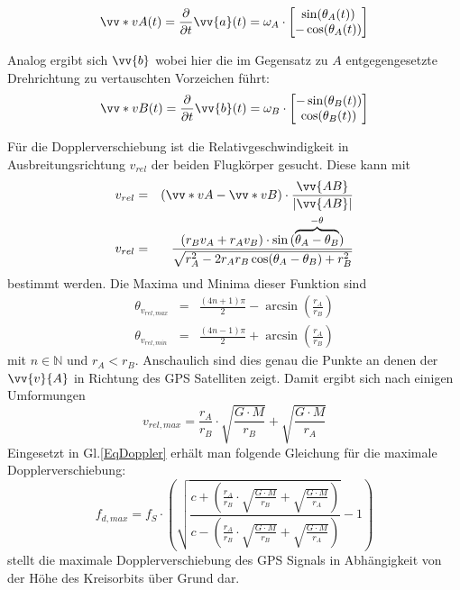 \begin{equation}
    \vv*{v}{A}(t)=\frac{\partial}{\partial t}\vv{a}(t)
    = \omega_A \cdot \begin{bmatrix} 
        \sin(\theta_A(t))\\ 
        -\cos(\theta_A(t)) 
    \end{bmatrix}
\end{equation}

Analog ergibt sich $\vv{b}$ wobei hier die im Gegensatz zu $A$ entgegengesetzte Drehrichtung zu vertauschten Vorzeichen führt:
\begin{equation}
    \vv*{v}{B}(t)=\frac{\partial}{\partial t}\vv{b}(t)
    = \omega_B \cdot \begin{bmatrix} 
        -\sin(\theta_B(t))\\ 
        \cos(\theta_B(t)) 
    \end{bmatrix}
\end{equation}

Für die Dopplerverschiebung ist die Relativgeschwindigkeit in Ausbreitungsrichtung $v_{rel}$ der beiden Flugkörper gesucht. Diese kann mit 
\begin{eqnarray}
    v_{rel} &=&(\vv*{v}{A}-\vv*{v}{B} ) \cdot \frac{\vv{AB}}{|\vv{AB}|}\\
     v_{rel} &=& \frac{(r_B v_A + r_A v_B) \cdot \sin{(\overbrace{\theta_A-\theta_B}^{-\theta}})}{\sqrt{r_A^2-2 r_A r_B \cos(\theta_A-\theta_B)+r_B^2}}
\end{eqnarray}
bestimmt werden. Die Maxima und Minima dieser Funktion sind
\begin{eqnarray}
    \theta_{v_{rel,max}}&=&\frac{(4n+1)\pi}{2}-\arcsin\left(\frac{r_A}{r_B}\right)\\
    \theta_{v_{rel,min}}&=&\frac{(4n-1)\pi}{2}+\arcsin\left(\frac{r_A}{r_B}\right)
\end{eqnarray}
mit $n\in \mathbb{N}$ und $r_A<r_B$. Anschaulich sind dies genau die Punkte an denen der $\vv{v}{A}$ in Richtung des GPS Satelliten zeigt. Damit ergibt sich nach einigen Umformungen
\begin{equation}
    v_{rel,max}=\frac{r_A}{r_B}\cdot \sqrt{\frac{G \cdot M}{r_B}} + \sqrt{\frac{G\cdot M}{r_A}}
\end{equation}
Eingesetzt in Gl.\ref{EqDoppler} erhält man folgende Gleichung für die maximale Dopplerverschiebung:
\begin{equation}
	f_{d,max} = f_S \cdot \left(\sqrt{\frac{c+\left(\frac{r_A}{r_B}\cdot \sqrt{\frac{G \cdot M}{r_B}} + \sqrt{\frac{G\cdot M}{r_A}}\right)}{c-\left(\frac{r_A}{r_B}\cdot \sqrt{\frac{G \cdot M}{r_B}} + \sqrt{\frac{G\cdot M}{r_A}}\right)}}-1\right)
\end{equation}
 stellt die maximale Dopplerverschiebung des GPS Signals in Abhängigkeit von der Höhe des Kreisorbits über Grund dar.

